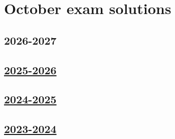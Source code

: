 
\newpage
\thispagestyle{empty}
\section{October exam solutions}

\subsection{2026-2027}
\label{sec:sol_kr_01_2026_2027}

\subsection[2025-2026]{\hyperref[sec:kr_01_2025_2026]{2025-2026}}
\label{sec:sol_kr_01_2025_2026} %

\subsection[2024-2025]{\hyperref[sec:kr_01_2024_2025]{2024-2025}}
\label{sec:sol_kr_01_2024_2025} %




\subsection[2023-2024]{\hyperref[sec:kr_01_2023_2024]{2023-2024}}
\label{sec:sol_kr_01_2023_2024} %


